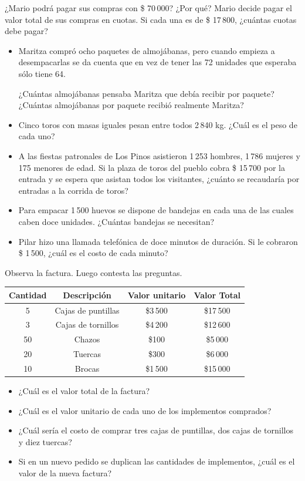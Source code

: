 \documentclass[letterpaper,11pt,twoside]{article}
\begin{document}
¿Mario podrá pagar sus compras con \$ 70\,000? ¿Por qué?
Mario decide pagar el valor total de sus compras en cuotas.
Si cada una es de \$ 17\,800, ¿cuántas cuotas debe pagar?
\begin{itemize}
\item Maritza compró ocho paquetes de almojábanas, pero
cuando empieza a desempacarlas se da cuenta que en vez
de tener las 72 unidades que esperaba sólo tiene 64.

¿Cuántas almojábanas pensaba Maritza que debía recibir
por paquete? ¿Cuántas almojábanas por paquete recibió
realmente Maritza?
\item Cinco toros con masas iguales pesan entre todos 2\,840
kg. ¿Cuál es el peso de cada uno?
\item A las fiestas patronales de Los Pinos asistieron 1\,253 hombres, 1\,786 mujeres y 175 menores de edad. Si la
plaza de toros del pueblo cobra \$ 15\,700 por la entrada
y se espera que asistan todos los visitantes, ¿cuánto se
recaudaría por entradas a la corrida de toros?
\item Para empacar 1\,500 huevos se dispone de bandejas en
cada una de las cuales caben doce unidades. ¿Cuántas
bandejas se necesitan?
\item Pilar hizo una llamada telefónica de doce minutos de
duración. Si le cobraron \$ 1\,500, ¿cuál es el costo de
cada minuto?
 \end{itemize}
 Observa la factura. Luego contesta las preguntas.
\begin{center}
\begin{tabular}{|c|c|c|c|}
\hline 
\textbf{Cantidad} & \textbf{Descripción} & \textbf{Valor unitario} & \textbf{Valor Total} \\ 
\hline 
5 & Cajas de puntillas & \$3\,500 & \$17\,500 \\ 
\hline 
3 & Cajas de tornillos & \$4\,200 & \$12\,600 \\ 
\hline 
50 & Chazos & \$100 & \$5\,000 \\ 
\hline 
20 & Tuercas & \$300 & \$6\,000 \\ 
\hline 
10 & Brocas & \$1\,500 & \$15\,000 \\ 
\hline 
\end{tabular} 
\end{center}
\begin{itemize}
\item ¿Cuál es el valor total de la factura?
\item ¿Cuál es el valor unitario de cada uno de los implementos comprados?
\item ¿Cuál sería el costo de comprar tres cajas de puntillas, dos cajas de tornillos y
diez tuercas?
\item Si en un nuevo pedido se duplican las cantidades de implementos, ¿cuál es el valor de la nueva factura?
\end{itemize}
\end{document}
